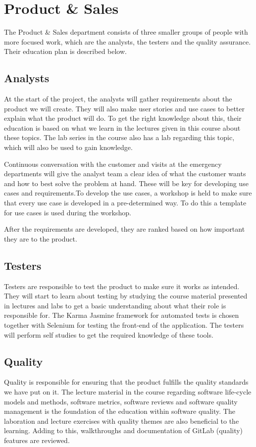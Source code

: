 \section{Product \& Sales}
\label{sec:pands}

The Product \& Sales department consists of three smaller groups of people with more focused work, which are the analysts, the testers and the quality assurance. Their education plan is described below.

\subsection{Analysts}
At the start of the project, the analysts will gather requirements about the product we will create. They will also make user stories and use cases to better explain what the product will do. To get the right knowledge about this, their education is based on what we learn in the lectures given in this course about these topics. The lab series in the course also has a lab regarding this topic, which will also be used to gain knowledge.

Continuous conversation with the customer and visits at the emergency departments will give the analyst team a clear idea of what the customer wants and how to best solve the problem at hand. These will be key for developing use cases and requirements.To develop the use cases, a workshop is held to make sure that every use case is developed in a pre-determined way. To do this a template for use cases is used during the workshop.

After the requirements are developed, they are ranked based on how important they are to the product.


\subsection{Testers}
Testers are responsible to test the product to make sure it works as intended. They will start to learn about testing by studying the course material presented in lectures and labs to get a basic understanding about what their role is responsible for. The Karma Jasmine framework for automated tests is chosen together with Selenium for testing the front-end of the application. The testers will perform self studies to get the required knowledge of these tools. 

\subsection{Quality}
Quality is responsible for ensuring that the product fulfills the quality standards we have put on it. The lecture material in the course regarding software life-cycle models and methods, software metrics, software reviews and software quality management is the foundation of the education within software quality. The laboration and lecture exercises with quality themes are also beneficial to the learning. Adding to this, walkthroughs and documentation of GitLab (quality) features are reviewed.



